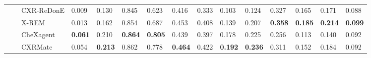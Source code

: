 \begin{tabular}{lllllllllllllll}
 &  & CXR-ReDonE & 0.009 & 0.130 & 0.845 & 0.623 & 0.416 & 0.333 & 0.103 & 0.124 & 0.327 & 0.165 & 0.171 & 0.088 \\
 &  & X-REM & 0.013 & 0.162 & 0.854 & 0.687 & 0.453 & 0.408 & 0.139 & 0.207 & \textbf{0.358} & \textbf{0.185} & \textbf{0.214} & \textbf{0.099} \\
 &  & CheXagent & \textbf{0.061} & 0.210 & \textbf{0.864} & \textbf{0.805} & 0.439 & 0.397 & 0.178 & 0.225 & 0.256 & 0.113 & 0.140 & 0.092 \\
 &  & CXRMate & 0.054 & \textbf{0.213} & 0.862 & 0.778 & \textbf{0.464} & 0.422 & \textbf{0.192} & \textbf{0.236} & 0.311 & 0.152 & 0.184 & 0.092 \\
\cmidrule{1-15} \cmidrule{2-15}
\bottomrule
\end{tabular}
